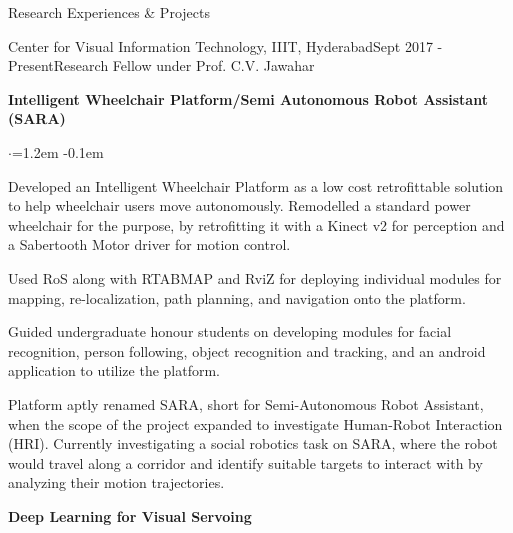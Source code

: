 \documentclass{resume} %
\begin{document}
\begin{rSection}{Research Experiences \& Projects}

\begin{rSubsection}{Center for Visual Information Technology, IIIT, Hyderabad}{Sept 2017 - Present}{Research Fellow under Prof. C.V. Jawahar}{}

{\textbullet \hspace{0.1em} \textbf{Intelligent Wheelchair Platform/Semi Autonomous Robot Assistant (SARA)}}

\vspace*{-0.2em}
\begin{list}{$\cdot$}{\leftmargin=1.2em}
\itemsep-0.1em 
\item Developed an Intelligent Wheelchair Platform as a low cost retrofittable solution to help wheelchair users move autonomously.
Remodelled a standard power wheelchair for the purpose, by retrofitting it with a Kinect v2 for perception and a Sabertooth Motor driver for motion control.
\item Used RoS along with RTABMAP and RviZ for deploying individual modules for mapping, re-localization, path planning, and navigation onto the platform. 
\item Guided undergraduate honour students on developing modules for facial recognition, person following, object recognition and tracking, and an android application to utilize the platform.
\item Platform aptly renamed SARA, short for Semi-Autonomous Robot Assistant, when the scope of the project expanded to investigate Human-Robot Interaction (HRI). Currently investigating a social robotics task on SARA, where the robot would travel along a corridor and identify suitable targets to interact with by analyzing their motion trajectories.
\end{list}

{\textbullet \hspace{0.1em} \textbf{Deep Learning for Visual Servoing}}


\end{rSubsection}
\end{rSection}
\end{document}
